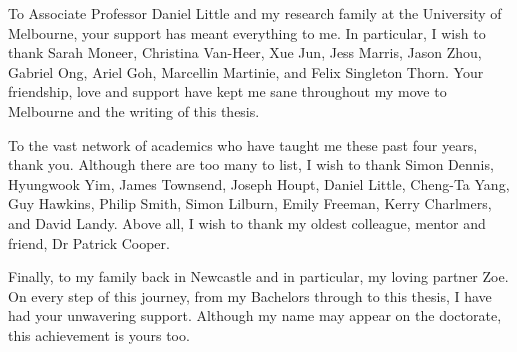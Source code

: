 \documentclass[12pt,oneside]{Thesis}
\begin{document}
{To Associate Professor Daniel Little and my research family at the University of Melbourne, your support has meant everything to me. In particular, I wish to thank Sarah Moneer, Christina Van-Heer, Xue Jun, Jess Marris, Jason Zhou, Gabriel Ong, Ariel Goh, Marcellin Martinie, and Felix Singleton Thorn. Your friendship, love and support have kept me sane throughout my move to Melbourne and the writing of this thesis. 

To the vast network of academics who have taught me these past four years, thank you. Although there are too many to list, I wish to thank Simon Dennis, Hyungwook Yim, James Townsend, Joseph Houpt, Daniel Little, Cheng-Ta Yang, Guy Hawkins, Philip Smith, Simon Lilburn, Emily Freeman, Kerry Charlmers, and David Landy. Above all, I wish to thank my oldest colleague, mentor and friend, Dr Patrick Cooper.

Finally, to my family back in Newcastle and in particular, my loving partner Zoe. On every step of this journey, from my Bachelors through to this thesis, I have had your unwavering support. Although my name may appear on the doctorate, this achievement is yours too.}

\clearpage 

\clearpage 
\end{document}
